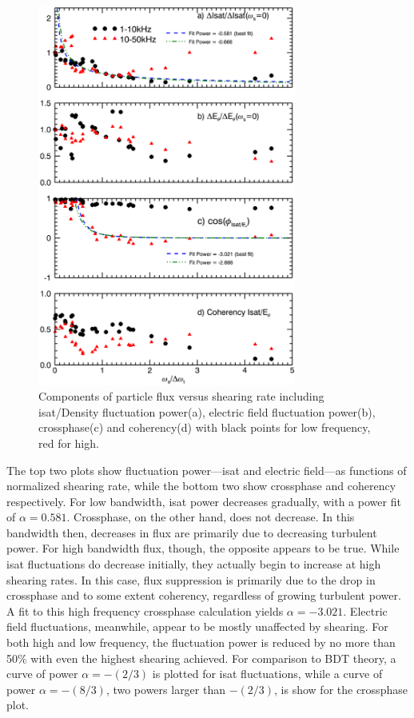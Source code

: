 \documentclass[%
 aps,
 prl,
 amsmath,amssymb,
 reprint,%
]{revtex4-1}
\begin{document}
\begin{figure}
\begin{center}
\includegraphics[width=8.5cm]{fluxcomps.pdf}%
\caption{\label{fig:fluxcomps} Components of particle flux versus shearing rate including isat/Density fluctuation power(a), electric field fluctuation power(b), crossphase(c) and coherency(d) with black points for low frequency, red for high.}
\end{center}
\end{figure}

The top two plots show fluctuation power---isat and electric field---as functions of normalized shearing rate, while the bottom two show crossphase and coherency respectively. For low bandwidth, isat power decreases gradually, with a power fit of $\alpha = 0.581$. Crossphase, on the other hand, does not decrease. In this bandwidth then, decreases in flux are primarily due to decreasing turbulent power. For high bandwidth flux, though, the opposite appears to be true. While isat fluctuations do decrease initially, they actually begin to increase at high shearing rates. In this case, flux suppression is primarily due to the drop in crossphase and to some extent coherency, regardless of growing turbulent power. A fit to this high frequency crossphase calculation yields $\alpha = -3.021$.  Electric field fluctuations, meanwhile, appear to be mostly unaffected by shearing. For both high and low frequency, the fluctuation power is reduced by no more than 50\% with even the highest shearing achieved. For comparison to BDT theory, a curve of power $\alpha = -(2/3)$ is plotted for isat fluctuations, while a curve of power $\alpha = -(8/3)$, two powers larger than $-(2/3)$, is show for the crossphase plot.
\end{document}
